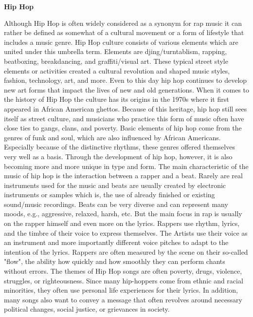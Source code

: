 \textbf{Hip Hop}

Although Hip Hop is often widely considered as a synonym for rap music it can rather be defined as somewhat
of a cultural movement or a form of lifestyle that includes a music genre.
Hip Hop culture consists of various elements which are united under this umbrella term.
Elements are djing/turntablism, rapping, beatboxing, breakdancing, and graffiti/visual art.\cite{MusicalDictHipHop}
These typical street style elements or activities created a cultural revolution and shaped music styles,
fashion, technology, art, and more.\cite{TateHipHop}
Even to this day hip hop continues to develop new art forms that impact the lives of new and old generations.
When it comes to the history of Hip Hop the culture has its origins in the 1970s where it first appeared
in African American ghettos.
Because of this heritage, hip hop still sees itself as street culture, and musicians who practice
this form of music often have close ties to gangs, clans, and poverty.\cite{Rory2019}
Basic elements of hip hop come from the genres of funk and soul, which are also influenced by
African Americans.
Especially because of the distinctive rhythms, these genres offered themselves very well as a basis.
Through the development of hip hop, however, it is also becoming more and more unique in type and form.
The main characteristic of the music of hip hop is the interaction between a rapper and a beat.
Rarely are real instruments used for the music and beats are usually created by electronic
instruments or samples which is, the use of already finished or existing sound/music recordings.
Beats can be very diverse and can represent many moods, e.g., aggressive, relaxed, harsh, etc.\cite{MusicalDictHipHop}
But the main focus in rap is usually on the rapper himself and even more on the lyrics.
Rappers use rhythm, lyrics, and the timbre of their voice to express themselves.
The Artists use their voice as an instrument and more importantly different voice pitches
to adapt to the intention of the lyrics.
Rappers are often measured by the scene on their so-called "flow",
the ability how quickly and how smoothly they can perform chants without errors.
The themes of Hip Hop songs are often poverty, drugs, violence, struggles, or righteousness.
Since many hip-hoppers come from ethnic and racial minorities, they often use personal life
experiences for their lyrics.
In addition, many songs also want to convey a message that often revolves around necessary
political changes, social justice, or grievances in society.\cite{Goodrich2017}

